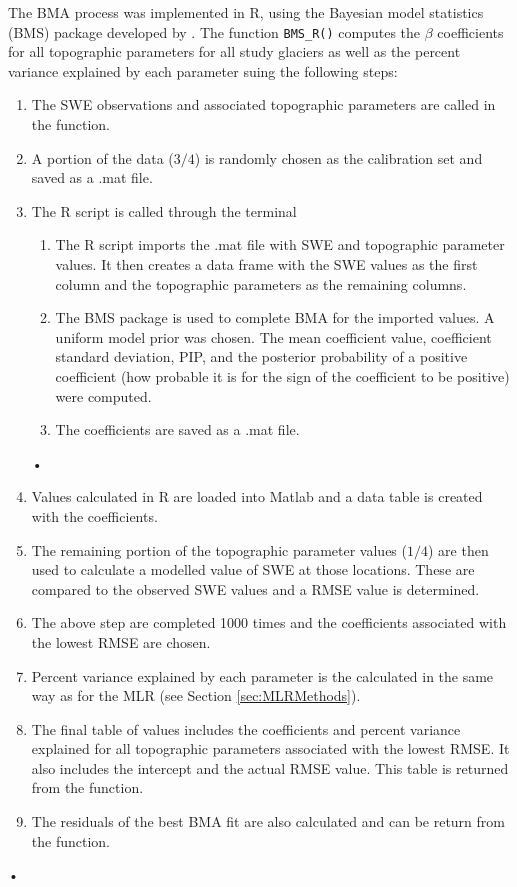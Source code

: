 \documentclass[12pt]{article}
\begin{document}
The BMA process was implemented in R, using the Bayesian model statistics (BMS) package developed by \cite{Zeugner2015}. The function \texttt{BMS\_R()} computes the $\beta$ coefficients for all topographic parameters for all study glaciers as well as the percent variance explained by each parameter suing the following steps:
\begin{enumerate}
\item The SWE observations and associated topographic parameters are called in the function.
\item A portion of the data ($3/4$) is randomly chosen as the calibration set and saved as a .mat file. 
\item The R script is called through the terminal
	\begin{enumerate}
		\item The R script imports the .mat file with SWE and topographic parameter values. It then creates a data 				frame with the SWE values as the first column and the topographic parameters as the remaining 					columns. 
		\item The BMS package is used to complete BMA for the imported values. A uniform model prior was chosen. 				The mean coefficient value, coefficient standard deviation, PIP, and the posterior probability of a positive 			coefficient (how probable it is for the sign of the coefficient to be positive) were computed.
		\item The coefficients are saved as a .mat file.
	\end{enumerate}•
\item Values calculated in R are loaded into Matlab and a data table is created with the coefficients.
\item The remaining portion of the topographic parameter values ($1/4$) are then used to calculate a modelled value of 		SWE at those locations. These are compared to the observed SWE values and a RMSE value is determined.
\item The above step are completed 1000 times and the coefficients associated with the lowest RMSE are chosen.
\item Percent variance explained by each parameter is the calculated in the same way as for the MLR (see Section 			\ref{sec:MLRMethods}). 
\item The final table of values includes the coefficients and percent variance explained for all topographic parameters associated with the lowest RMSE. It also includes the intercept and the actual RMSE value. This table is returned from the function.
\item The residuals of the best BMA fit are also calculated and can be return from the function.  
\end{enumerate}•
\end{document}
